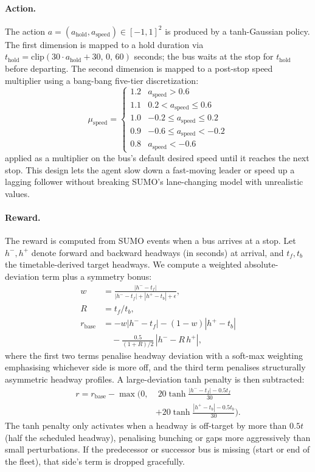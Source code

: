 \documentclass[journal,10pt]{IEEEtran}
\begin{document}
\paragraph{Action.} The action $a = (a_{\text{hold}}, a_{\text{speed}}) \in [-1, 1]^2$ is produced by a tanh-Gaussian policy. The first dimension is mapped to a hold duration via $t_{\text{hold}} = \text{clip}(30 \cdot a_{\text{hold}} + 30,\, 0,\, 60)$ seconds; the bus waits at the stop for $t_{\text{hold}}$ before departing. The second dimension is mapped to a post-stop speed multiplier using a bang-bang five-tier discretization:
\[
\mu_{\text{speed}} = \begin{cases}
1.2 & a_{\text{speed}} > 0.6 \\
1.1 & 0.2 < a_{\text{speed}} \le 0.6 \\
1.0 & -0.2 \le a_{\text{speed}} \le 0.2 \\
0.9 & -0.6 \le a_{\text{speed}} < -0.2 \\
0.8 & a_{\text{speed}} < -0.6
\end{cases}
\]
applied as a multiplier on the bus's default desired speed until it reaches the next stop. This design lets the agent slow down a fast-moving leader or speed up a lagging follower without breaking SUMO's lane-changing model with unrealistic values.

\paragraph{Reward.} The reward is computed from SUMO events when a bus arrives at a stop. Let $h^{-}, h^{+}$ denote forward and backward headways (in seconds) at arrival, and $t_f, t_b$ the timetable-derived target headways. We compute a weighted absolute-deviation term plus a symmetry bonus:
\begin{align}
w &= \frac{|h^- - t_f|}{|h^- - t_f| + |h^+ - t_b| + \epsilon}, \nonumber\\
R &= t_f / t_b, \nonumber\\
r_{\text{base}} &= -w |h^- - t_f| - (1-w) |h^+ - t_b| \nonumber\\
                &\quad - \tfrac{0.5}{(1+R)/2}\,|h^- - R\,h^+|,
\end{align}
where the first two terms penalise headway deviation with a soft-max weighting emphasising whichever side is more off, and the third term penalises structurally asymmetric headway profiles. A large-deviation tanh penalty is then subtracted:
\begin{align}
r = r_{\text{base}} - \max\big(0, &\; 20\tanh\!\tfrac{|h^- - t_f|-0.5 t_f}{30} \nonumber\\
                                    &+ 20\tanh\!\tfrac{|h^+ - t_b|-0.5 t_b}{30} \big).
\end{align}
The tanh penalty only activates when a headway is off-target by more than $0.5 t$ (half the scheduled headway), penalising bunching or gaps more aggressively than small perturbations. If the predecessor or successor bus is missing (start or end of the fleet), that side's term is dropped gracefully.
\end{document}
